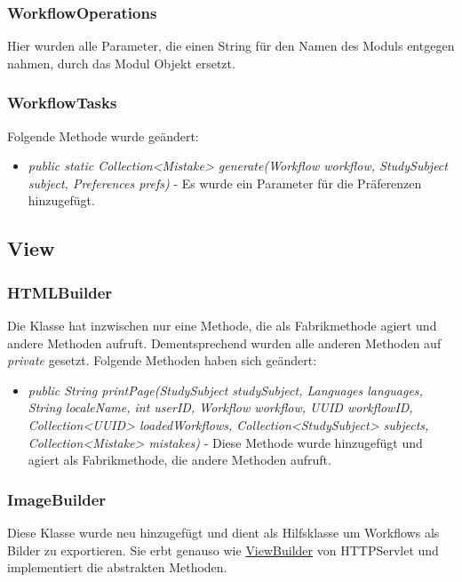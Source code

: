 \documentclass[parskip=full]{scrartcl}
\begin{document}
			\subsubsection{WorkflowOperations}
				Hier wurden alle Parameter, die einen String für den Namen des Moduls entgegen nahmen, durch das Modul Objekt ersetzt.
				
			\subsubsection{WorkflowTasks}
				Folgende Methode wurde geändert:
				\begin{itemize}
					\item \textit{public static Collection<Mistake> generate(Workflow workflow, StudySubject subject, Preferences prefs)} - Es wurde ein Parameter für die Präferenzen hinzugefügt.
				\end{itemize}
			
		\subsection{View}
		
			\subsubsection{HTMLBuilder}
				Die Klasse hat inzwischen nur eine Methode, die als Fabrikmethode agiert und andere Methoden aufruft. Dementsprechend wurden alle anderen Methoden auf \textit{private} gesetzt.
				Folgende Methoden haben sich geändert:
				\begin{itemize}
					\item \textit{public String printPage(StudySubject studySubject, Languages languages, String localeName, int userID, Workflow workflow, UUID workflowID, Collection<UUID> loadedWorkflows, Collection<StudySubject> subjects, Collection<Mistake> mistakes)} - Diese Methode wurde hinzugefügt und agiert als Fabrikmethode, die andere Methoden aufruft.
				\end{itemize}
		
			\subsubsection{ImageBuilder}
				Diese Klasse wurde neu hinzugefügt und dient als Hilfsklasse um Workflows als Bilder zu exportieren. Sie erbt genauso wie \hyperlink{view:ViewBuilder}{ViewBuilder} von HTTPServlet und implementiert die abstrakten Methoden.
		
\end{document}
